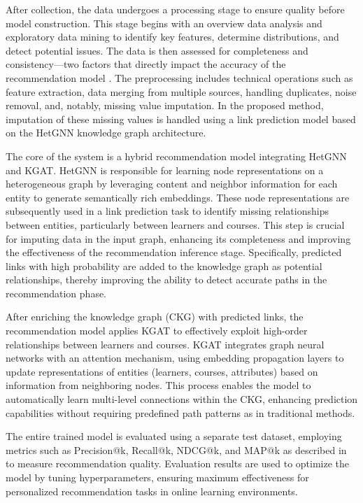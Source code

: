 \documentclass{ieeeaccess}
\begin{document}
After collection, the data undergoes a processing stage to ensure quality before model construction. This stage begins with an overview data analysis and exploratory data mining to identify key features, determine distributions, and detect potential issues. The data is then assessed for completeness and consistency—two factors that directly impact the accuracy of the recommendation model \cite{nguyen2025data_quality}. The preprocessing includes technical operations such as feature extraction, data merging from multiple sources, handling duplicates, noise removal, and, notably, missing value imputation. In the proposed method, imputation of these missing values is handled using a link prediction model based on the HetGNN knowledge graph architecture.

The core of the system is a hybrid recommendation model integrating HetGNN and KGAT. HetGNN is responsible for learning node representations on a heterogeneous graph by leveraging content and neighbor information for each entity to generate semantically rich embeddings. These node representations are subsequently used in a link prediction task to identify missing relationships between entities, particularly between learners and courses. This step is crucial for imputing data in the input graph, enhancing its completeness and improving the effectiveness of the recommendation inference stage. Specifically, predicted links with high probability are added to the knowledge graph as potential relationships, thereby improving the ability to detect accurate paths in the recommendation phase.

After enriching the knowledge graph (CKG) with predicted links, the recommendation model applies KGAT to effectively exploit high-order relationships between learners and courses. KGAT integrates graph neural networks with an attention mechanism, using embedding propagation layers to update representations of entities (learners, courses, attributes) based on information from neighboring nodes. This process enables the model to automatically learn multi-level connections within the CKG, enhancing prediction capabilities without requiring predefined path patterns as in traditional methods.

The entire trained model is evaluated using a separate test dataset, employing metrics such as Precision@k, Recall@k, NDCG@k, and MAP@k as described in \cite{nguyen2024hbert4rec, nguyen2025data_quality} to measure recommendation quality. Evaluation results are used to optimize the model by tuning hyperparameters, ensuring maximum effectiveness for personalized recommendation tasks in online learning environments.
\end{document}
